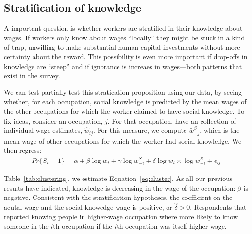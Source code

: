 \documentclass[11pt]{article}
\begin{document}
%   

%  





\subsection{Stratification of knowledge} 

A important question is whether workers are stratified in their knowledge about wages. 
If workers only know about wages ``locally'' they might be stuck in a kind of trap, unwilling to make substantial human capital investments without more certainty about the reward.  
This possibility is even more important if drop-offs in knowledge are ``steep'' and if ignorance is increaes in wages---both patterns that exist in the survey.  

We can test partially test this stratication proposition using our data, by seeing whether, for each occupation, social knowledge is predicted by the mean wages of the other occupations for which the worker claimed to have social knowledge. 
To fix ideas, consider an occupation, $j$. 
For that occupation, have an collection of individual wage estimates, $\hat{w}_{ij}$. 
For this measure, we compute $\bar{w}^S_{-j}$, which is the mean wage of other occupations for which the worker had social knowledge.  
We then regress: 
\begin{align} \label{eq:cluster}
Pr\{S_i = 1\} = \alpha + \beta \log w_i + \gamma \log \bar{w}^S_{-i} + \delta \log w_i \times \log \bar{w}^S_{-i} + \epsilon_{ij} 
\end{align} 

Table~\ref{tab:clustering}, we estimate Equation~\ref{eq:cluster}. 
As all our previous results have indicated, knowledge is decreasing in the wage of the occupation: $\hat{\beta}$ is negative. 
Consistent with the stratification hypotheses, the coefficient on the acutal wage and the social knowedge wage is positive, or $\hat{\delta} > 0$. 
Respondents that reported knowing people in higher-wage occupation where more likely to know someone in the $i$th occupation if the $i$th occupation was itself higher-wage. 

 
\end{document}
